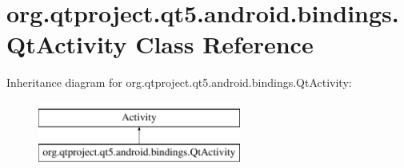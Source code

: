 \hypertarget{classorg_1_1qtproject_1_1qt5_1_1android_1_1bindings_1_1_qt_activity}{}\section{org.\+qtproject.\+qt5.\+android.\+bindings.\+Qt\+Activity Class Reference}
\label{classorg_1_1qtproject_1_1qt5_1_1android_1_1bindings_1_1_qt_activity}
Inheritance diagram for org.\+qtproject.\+qt5.\+android.\+bindings.\+Qt\+Activity\+:\begin{figure}[H]
\begin{center}
\leavevmode
\includegraphics[height=2.000000cm]{classorg_1_1qtproject_1_1qt5_1_1android_1_1bindings_1_1_qt_activity}
\end{center}
\end{figure}
